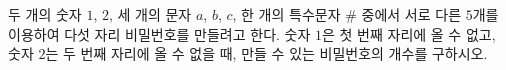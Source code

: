 \hspace*{2mm}\begin{minipage}[t]{\dimexpr\linewidth-2mm\relax}\vspace{0pt}
두 개의 숫자 $1$, $2$, 세 개의 문자 $a$, $b$, $c$, 한 개의 특수문자 $\#$ 중에서 서로 다른 $5$개를 이용하여 다섯 자리 비밀번호를 만들려고 한다. 숫자 $1$은 첫 번째 자리에 올 수 없고, 숫자 $2$는 두 번째 자리에 올 수 없을 때, 만들 수 있는 비밀번호의 개수를 구하시오.\end{minipage}
